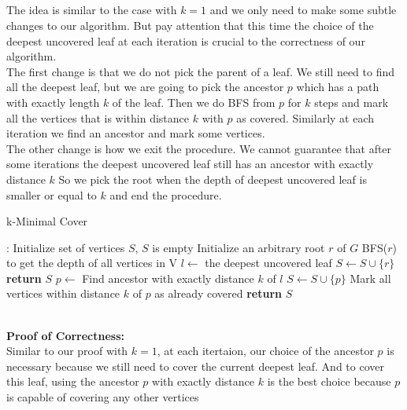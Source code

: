 \documentclass[12pt,letterpaper]{article}
\begin{document}
\subsection{}
The idea is similar to the case with $k=1$ 
and we only need to make some subtle changes to our algorithm.
But pay attention that this time the choice of the deepest uncovered leaf 
at each iteration is crucial to the correctness of our algorithm.\\
The first change is that we do not pick the parent of a leaf.
We still need to find all the deepest leaf,
but we are going to pick the ancestor $p$
which has a path with exactly length $k$ of the leaf.
Then we do BFS from $p$ for $k$ steps and mark all the vertices that is
within distance $k$ with $p$ as covered.
Similarly at each iteration we find an ancestor and mark some vertices.\\
The other change is how we exit the procedure.
We cannot guarantee that after some iterations the deepest uncovered leaf 
still has an ancestor with exactly distance $k$
So we pick the root when the depth of deepest uncovered leaf  
is smaller or equal to $k$ and end the procedure.\\
\begin{algorithm}
  \caption{k-Minimal Cover}\label{alg:kcover}
  \begin{algorithmic}[1]
  :
  \State Initialize set of vertices $S$, $S$ is empty
  \State Initialize an arbitrary root $r$ of $G$
  \State BFS($r$) to get the depth of all vertices in V
  \State $l\gets$ the deepest uncovered leaf
  \State $S\gets S\cup\{r\}$
  \State \textbf{return} $S$
  \EndIf
  \State $p\gets$ Find ancestor with exactly distance $k$ of $l$
  \State $S\gets S\cup \{p\}$
  \State Mark all vertices within distance $k$ of $p$ as already covered 
  \EndWhile
  \State \textbf{return} $S$
  \EndProcedure
  \end{algorithmic}
\end{algorithm}\\
\textbf{Proof of Correctness:}\\
Similar to our proof with $k=1$, at each itertaion,
our choice of the ancestor $p$ is necessary because 
we still need to cover the current deepest leaf.
And to cover this leaf,
using the ancestor $p$ with exactly distance $k$ is the best choice 
because $p$ is capable of covering any other vertices
\end{document}
